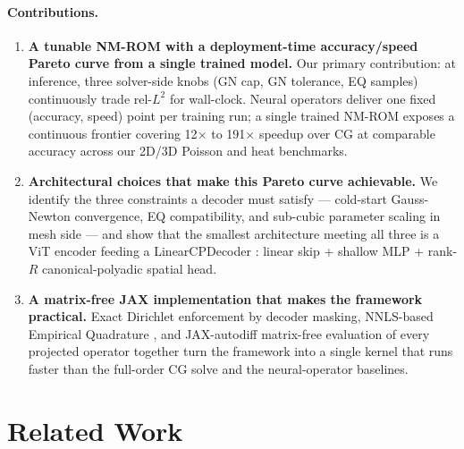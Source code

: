 \documentclass{article}
\begin{document}
\paragraph{Contributions.}
\begin{enumerate}
\item \textbf{A tunable NM-ROM with a deployment-time accuracy/speed
      Pareto curve from a single trained model.} Our primary
      contribution: at inference, three solver-side knobs (GN cap,
      GN tolerance, EQ samples) continuously trade rel-$L^2$ for
      wall-clock. Neural operators
      deliver one fixed
      (accuracy, speed) point per training run; a single trained
      NM-ROM exposes a continuous frontier covering 12$\times$ to
      191$\times$ speedup over CG at comparable accuracy across our
      2D/3D Poisson and heat benchmarks.
\item \textbf{Architectural choices that make this Pareto curve
      achievable.} We identify the three constraints a decoder must
      satisfy --- cold-start Gauss-Newton convergence, EQ
      compatibility, and sub-cubic parameter scaling in mesh side ---
      and show that the smallest architecture meeting all three is
      a ViT encoder 
      feeding a LinearCPDecoder
      \citep{KoldaBader2009CP}: linear skip + shallow MLP +
      rank-$R$ canonical-polyadic spatial head.
\item \textbf{A matrix-free JAX implementation that makes the
      framework practical.} Exact Dirichlet enforcement by decoder
      masking, NNLS-based Empirical Quadrature
      \citep{Hernandez2017EQ,YanoPatera2019LPEQ}, and JAX-autodiff
      \citep{Bradbury2018JAX} matrix-free evaluation of every
      projected operator together turn the framework into a single
      kernel that runs faster than the full-order CG solve and the neural-operator
      baselines.
\end{enumerate}


\section{Related Work}
\label{sec:related}
\end{document}
